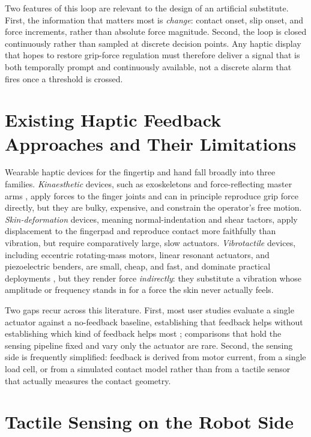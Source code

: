 \documentclass[12pt, a4paper, twoside, openright]{report}
\begin{document}
Two features of this loop are relevant to the design of an artificial
substitute. First, the information that matters most is \emph{change}: contact
onset, slip onset, and force increments, rather than absolute force magnitude.
Second, the loop is closed continuously rather than sampled at discrete
decision points. Any haptic display that hopes to restore grip-force regulation
must therefore deliver a signal that is both temporally prompt and continuously
available, not a discrete alarm that fires once a threshold is crossed.

\section{Existing Haptic Feedback Approaches and Their Limitations}
\label{sec:existing-approaches}

Wearable haptic devices for the fingertip and hand fall broadly into three
families. \emph{Kinaesthetic} devices, such as exoskeletons and
force-reflecting master arms \cite{kuchenbecker_2010}, apply forces to the
finger joints and can in principle reproduce grip force directly, but they are
bulky, expensive, and constrain the operator's free motion.
\emph{Skin-deformation} devices, meaning normal-indentation and shear tactors,
apply displacement to the fingerpad and reproduce contact more faithfully than
vibration, but require comparatively large, slow actuators.
\emph{Vibrotactile} devices, including eccentric rotating-mass motors, linear
resonant actuators, and piezoelectric benders, are small, cheap, and fast, and
dominate practical deployments \cite{pacchierotti2017,choi2013}, but they render force \emph{indirectly}: they
substitute a vibration whose amplitude or frequency stands in for a force the
skin never actually feels.

Two gaps recur across this literature. First, most user studies evaluate a
single actuator against a no-feedback baseline, establishing that feedback helps
without establishing which kind of feedback helps most \cite{luo2024,abdi2020}; comparisons that hold
the sensing pipeline fixed and vary only the actuator are rare. Second, the
sensing side is frequently simplified: feedback is derived from motor current,
from a single load cell, or from a simulated contact model rather than from a
tactile sensor that actually measures the contact geometry.

\section{Tactile Sensing on the Robot Side}
\label{sec:tactile-sensing}
\end{document}
